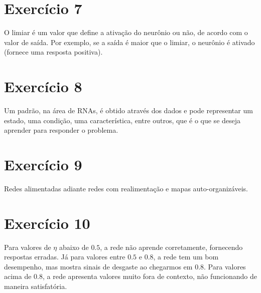\documentclass[a4]{article}
\begin{document}
\section*{Exercício 7}

O limiar é um valor que define a ativação do neurônio ou não, de acordo com o valor de saída. Por exemplo, se a saída é maior que o limiar, o neurônio é ativado (fornece uma resposta positiva).

\section*{Exercício 8}

Um padrão, na área de RNAs, é obtido através dos dados e pode representar um estado, uma condição, uma característica, entre outros, que é o que se deseja aprender para responder o problema.

\section*{Exercício 9}

Redes alimentadas adiante redes com realimentação e mapas auto-organizáveis.

\section*{Exercício 10}

Para valores de $ \eta $ abaixo de $ 0.5 $, a rede não aprende corretamente, fornecendo respostas erradas. Já para valores entre $ 0.5 $ e $ 0.8 $, a rede tem um bom desempenho, mas mostra sinais de desgaste ao chegarmos em $ 0.8 $. Para valores acima de $ 0.8 $, a rede apresenta valores muito fora de contexto, não funcionando de maneira satisfatória.
\end{document}
